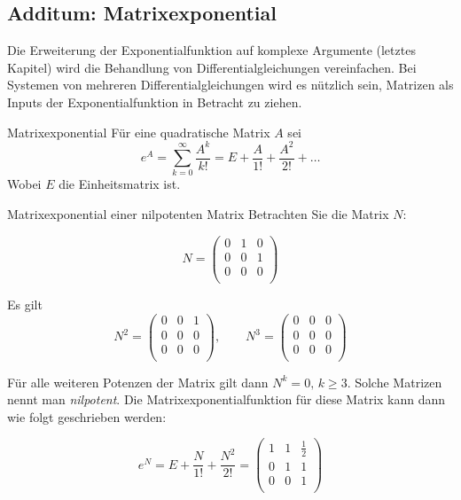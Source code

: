 \subsection*{Additum: Matrixexponential}
Die Erweiterung der Exponentialfunktion auf komplexe Argumente (letztes Kapitel) wird die Behandlung von Differentialgleichungen vereinfachen. Bei Systemen von mehreren Differentialgleichungen wird es nützlich sein, Matrizen als Inputs der Exponentialfunktion in Betracht zu ziehen.
\begin{definition}
	{Matrixexponential}{}
	Für eine quadratische Matrix $A$ sei
	$$e^A = \sum_{k=0}^\infty \frac{A^k}{k!} = E + \frac{A}{1!} + \frac{A^2}{2!} + \dots $$
	Wobei $E$ die Einheitsmatrix ist.
\end{definition}
\begin{bsp}
	{Matrixexponential einer nilpotenten Matrix}{}
	Betrachten Sie die Matrix $N$:

	$$
		N = \begin{pmatrix}
			0 & 1 & 0 \\
			0 & 0 & 1 \\
			0 & 0 & 0 \\
		\end{pmatrix}
	$$

	Es gilt
	$$
		N^2 = \begin{pmatrix}
			0 & 0 & 1 \\
			0 & 0 & 0 \\
			0 & 0 & 0 \\
		\end{pmatrix},
		\qquad
		N^3 = \begin{pmatrix}
			0 & 0 & 0 \\
			0 & 0 & 0 \\
			0 & 0 & 0 \\
		\end{pmatrix}
	$$

	Für alle weiteren Potenzen der Matrix gilt dann $N^k=0, \, k\ge3$. Solche Matrizen nennt man \emph{nilpotent}. Die Matrixexponentialfunktion für diese Matrix kann dann wie folgt geschrieben werden:

	$$
		e^N = E + \frac{N}{1!} + \frac{N^2}{2!} = \begin{pmatrix}
			1 & 1 & \frac{1}{2} \\
			0 & 1 & 1           \\
			0 & 0 & 1           \\
		\end{pmatrix}
	$$


\end{bsp}

